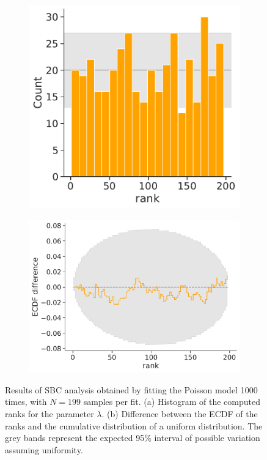 \begin{figure}[t]
\begin{subfigure}[b]{0.38\linewidth}
\includegraphics[width=\linewidth]{figures/ch2/poisson/SBChist_0.pdf}
\caption{}
\end{subfigure}
\hfill
\begin{subfigure}[b]{0.5\linewidth}
\includegraphics[width=\linewidth]{figures/ch2/poisson/SBCecdf_0.pdf}
\caption{}
\end{subfigure}
\caption{Results of SBC analysis obtained by fitting the Poisson model 1000 times, with $N=199$ samples per fit. (a) Histogram of the computed ranks for the parameter $\lambda$. (b) Difference between the ECDF of the ranks and the cumulative distribution of a uniform distribution. The grey bands represent the expected 95\% interval of possible variation assuming uniformity.}
\label{fig:poisson_SBC}
\end{figure}

